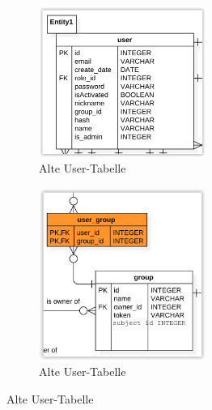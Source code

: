 \begin{figure}
	\centering
	\begin{subfigure}{.5\textwidth}
		\centering
		\includegraphics[width=0.6\textwidth]{Images/DB_User_Table.PNG}
		\caption{Alte User-Tabelle}
	\end{subfigure}%
	\begin{subfigure}{.5\textwidth}
		\centering
		\includegraphics[width=0.6\textwidth]{Images/DB_Group_Table.PNG}
		\caption{Alte User-Tabelle}
	\end{subfigure}
\end{figure}




